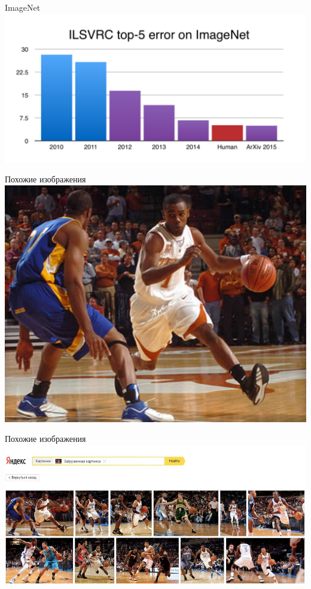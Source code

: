 \documentclass[10pt]{beamer}
\begin{document}
\begin{frame}{ImageNet}
  \centering
  \includegraphics[width=0.9 \textwidth, keepaspectratio = true]{images/top5}   
\end{frame}

\begin{frame}{Похожие изображения}
  \centering
  \includegraphics[width=0.9 \textwidth, keepaspectratio = true]{images/similar}   
\end{frame}

\begin{frame}{Похожие изображения}
  \centering
  \includegraphics[width=\textwidth, keepaspectratio = true]{images/similar2}   
\end{frame}
\end{document}
